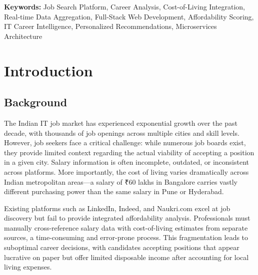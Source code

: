 \documentclass[12pt,a4paper,oneside]{report}
\begin{document}
\vspace{0.5cm}
\noindent\textbf{Keywords:} Job Search Platform, Career Analysis, Cost-of-Living Integration, Real-time Data Aggregation, Full-Stack Web Development, Affordability Scoring, IT Career Intelligence, Personalized Recommendations, Microservices Architecture

\newpage
\thispagestyle{frontmatter}
\tableofcontents

\newpage
\thispagestyle{frontmatter}
\listoffigures

\newpage
\thispagestyle{frontmatter}
\listoftables

\newpage
\pagestyle{fancy}
\chapter{Introduction}

\section{Background}

The Indian IT job market has experienced exponential growth over the past decade, with thousands of job openings across multiple cities and skill levels. However, job seekers face a critical challenge: while numerous job boards exist, they provide limited context regarding the actual viability of accepting a position in a given city. Salary information is often incomplete, outdated, or inconsistent across platforms. More importantly, the cost of living varies dramatically across Indian metropolitan areas---a salary of ₹60 lakhs in Bangalore carries vastly different purchasing power than the same salary in Pune or Hyderabad.

Existing platforms such as LinkedIn, Indeed, and Naukri.com excel at job discovery but fail to provide integrated affordability analysis. Professionals must manually cross-reference salary data with cost-of-living estimates from separate sources, a time-consuming and error-prone process. This fragmentation leads to suboptimal career decisions, with candidates accepting positions that appear lucrative on paper but offer limited disposable income after accounting for local living expenses.
\end{document}
